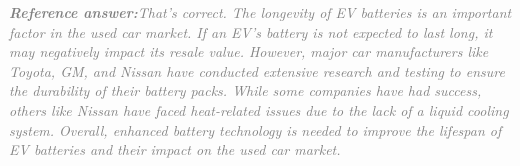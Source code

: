\documentclass[a4paper,11pt]{article}
\begin{document}
\begin{refanswerenv}
{\footnotesize\textit{\textcolor{gray}{\textbf{Reference answer:}\enspace That's correct. The longevity of EV batteries is an important factor in the used car market. If an EV's battery is not expected to last long, it may negatively impact its resale value. However, major car manufacturers like Toyota, GM, and Nissan have conducted extensive research and testing to ensure the durability of their battery packs. While some companies have had success, others like Nissan have faced heat-related issues due to the lack of a liquid cooling system. Overall, enhanced battery technology is needed to improve the lifespan of EV batteries and their impact on the used car market.}}}
\end{refanswerenv}
\end{document}
